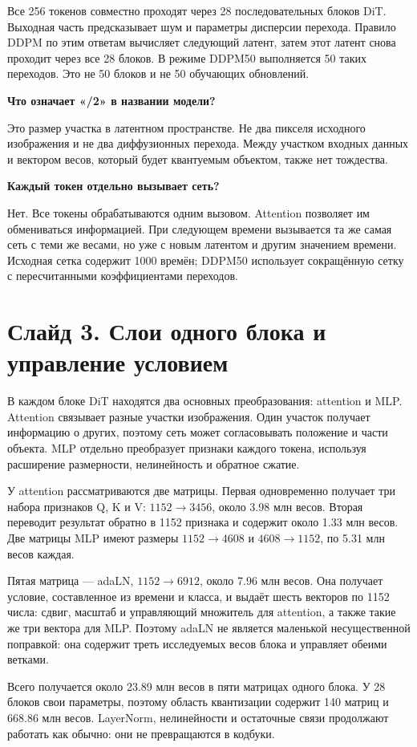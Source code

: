 \documentclass[a4paper,11pt]{article}
\newcommand{\slide}[2]{\clearpage\section*{Слайд #1. #2}}
\newcommand{\question}[1]{\par\textbf{#1}\par}
\begin{document}
Все 256 токенов совместно проходят через 28 последовательных блоков DiT.
Выходная часть предсказывает шум и параметры дисперсии перехода.
Правило DDPM по этим ответам вычисляет следующий латент, затем этот
латент снова проходит через все 28 блоков. В режиме DDPM50 выполняется
50 таких переходов. Это не 50 блоков и не 50 обучающих обновлений.

\question{Что означает «/2» в названии модели?}
Это размер участка в латентном пространстве. Не два пикселя исходного
изображения и не два диффузионных перехода. Между участком входных данных
и вектором весов, который будет квантуемым объектом, также нет тождества.

\question{Каждый токен отдельно вызывает сеть?}
Нет. Все токены обрабатываются одним вызовом. Attention позволяет им
обмениваться информацией. При следующем времени вызывается та же самая
сеть с теми же весами, но уже с новым латентом и другим значением времени.
Исходная сетка содержит 1000 времён; DDPM50 использует сокращённую сетку
с пересчитанными коэффициентами переходов.

\slide{3}{Слои одного блока и управление условием}
В каждом блоке DiT находятся два основных преобразования: attention и MLP.
Attention связывает разные участки изображения. Один участок получает
информацию о других, поэтому сеть может согласовывать положение и части
объекта. MLP отдельно преобразует признаки каждого токена, используя
расширение размерности, нелинейность и обратное сжатие.

У attention рассматриваются две матрицы. Первая одновременно получает
три набора признаков Q, K и V: $1152\to3456$, около 3.98 млн весов.
Вторая переводит результат обратно в 1152 признака и содержит около
1.33 млн весов. Две матрицы MLP имеют размеры $1152\to4608$ и
$4608\to1152$, по 5.31 млн весов каждая.

Пятая матрица --- adaLN, $1152\to6912$, около 7.96 млн весов.
Она получает условие, составленное из времени и класса, и выдаёт
шесть векторов по 1152 числа: сдвиг, масштаб и управляющий множитель
для attention, а также такие же три вектора для MLP. Поэтому adaLN
не является маленькой несущественной поправкой: она содержит треть
исследуемых весов блока и управляет обеими ветками.

Всего получается около 23.89 млн весов в пяти матрицах одного блока.
У 28 блоков свои параметры, поэтому область квантизации содержит
140 матриц и 668.86 млн весов. LayerNorm, нелинейности и остаточные
связи продолжают работать как обычно: они не превращаются в кодбуки.
\end{document}
